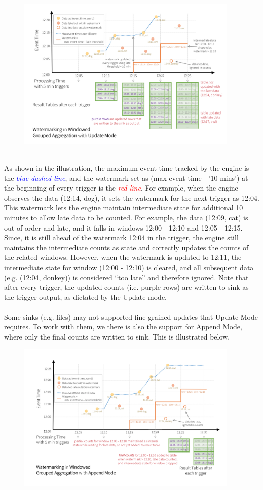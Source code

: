 \documentclass[10pt,a4paper]{article}
\newcommand{\nline}{\\~\\}
\begin{document}
   \begin{figure}[ht!]
 \hfill \includegraphics[width=300pt]{images/spark-streaming-watermark-update}
 \hspace*{\fill}
 \end{figure} \\
 As shown in the illustration, the maximum event time tracked by the engine is the \textcolor{blue}{\textit{blue dashed line}}, and the watermark set as (max event time - '10 mins') at the beginning of every trigger is the \textcolor{red}{\textit{red line}}. For example, when the engine observes the data (12:14, dog), it sets the watermark for the next trigger as 12:04. This watermark lets the engine maintain intermediate state for additional 10 minutes to allow late data to be counted. For example, the data (12:09, cat) is out of order and late, and it falls in windows 12:00 - 12:10 and 12:05 - 12:15. Since, it is still ahead of the watermark 12:04 in the trigger, the engine still maintains the intermediate counts as state and correctly updates the counts of the related windows. However, when the watermark is updated to 12:11, the intermediate state for window (12:00 - 12:10) is cleared, and all subsequent data (e.g. (12:04, donkey)) is considered “too late” and therefore ignored. Note that after every trigger, the updated counts (i.e. purple rows) are written to sink as the trigger output, as dictated by the Update mode.
\nline
Some sinks (e.g. files) may not supported fine-grained updates that Update Mode requires. To work with them, we there is also the support for Append Mode, where only the final counts are written to sink. This is illustrated below.
   \begin{figure}[ht!]
 \hfill \includegraphics[width=300pt]{images/spark-streaming-watermark-append}
 \hspace*{\fill}
 \end{figure} \\
\end{document}
